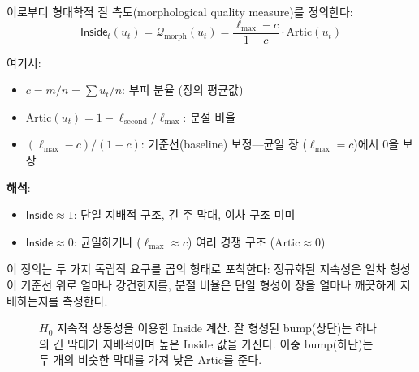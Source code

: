 이로부터 형태학적 질 측도(morphological quality measure)를 정의한다:
\begin{equation}
    \boxed{\mathsf{Inside}_t(u_t) = \mathcal{Q}_{\mathrm{morph}}(u_t) = \frac{\ell_{\max} - c}{1 - c} \cdot \mathrm{Artic}(u_t)}
    \label{eq:inside-def}
\end{equation}

여기서:
\begin{itemize}
    \item $c = m/n = \sum u_t / n$: 부피 분율 (장의 평균값)
    \item $\mathrm{Artic}(u_t) = 1 - \ell_{\mathrm{second}} / \ell_{\max}$: 분절 비율
    \item $(\ell_{\max} - c)/(1-c)$: 기준선(baseline) 보정---균일 장 ($\ell_{\max} = c$)에서 0을 보장
\end{itemize}

\textbf{해석}:
\begin{itemize}
    \item $\mathsf{Inside} \approx 1$: 단일 지배적 구조, 긴 주 막대, 이차 구조 미미
    \item $\mathsf{Inside} \approx 0$: 균일하거나 ($\ell_{\max} \approx c$) 여러 경쟁 구조 ($\mathrm{Artic} \approx 0$)
\end{itemize}

이 정의는 두 가지 독립적 요구를 곱의 형태로 포착한다: 정규화된 지속성은 일차 형성이 기준선 위로 얼마나 강건한지를, 분절 비율은 단일 형성이 장을 얼마나 깨끗하게 지배하는지를 측정한다.

\begin{figure}[t]
\centering
\caption{$H_0$ 지속적 상동성을 이용한 Inside 계산. 잘 형성된 bump(상단)는 하나의 긴 막대가 지배적이며 높은 Inside 값을 가진다. 이중 bump(하단)는 두 개의 비슷한 막대를 가져 낮은 Artic를 준다.}
\label{fig:inside-persistence}
\end{figure}


